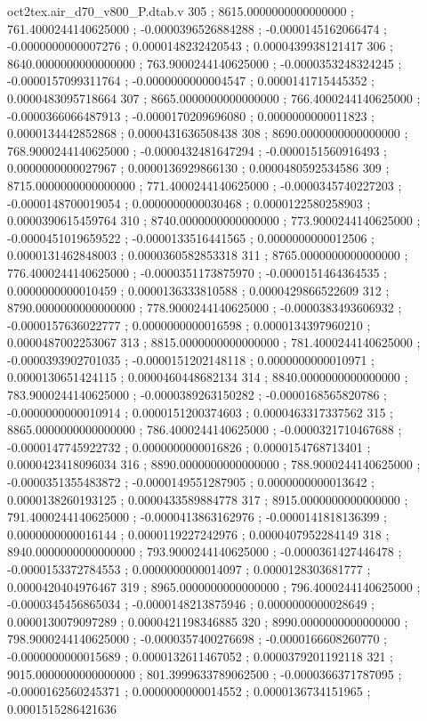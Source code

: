 \begin{filecontents}[overwrite]{oct2tex.air_d70_v800_P.dtab.v}
305 ; 8615.0000000000000000 ; 761.4000244140625000 ; -0.0000396526884288 ; -0.0000145162066474 ; -0.0000000000007276 ; 0.0000148232420543 ; 0.0000439938121417
306 ; 8640.0000000000000000 ; 763.9000244140625000 ; -0.0000353248324245 ; -0.0000157099311764 ; -0.0000000000004547 ; 0.0000141715445352 ; 0.0000483095718664
307 ; 8665.0000000000000000 ; 766.4000244140625000 ; -0.0000366066487913 ; -0.0000170209696080 ; 0.0000000000011823 ; 0.0000134442852868 ; 0.0000431636508438
308 ; 8690.0000000000000000 ; 768.9000244140625000 ; -0.0000432481647294 ; -0.0000151560916493 ; 0.0000000000027967 ; 0.0000136929866130 ; 0.0000480592534586
309 ; 8715.0000000000000000 ; 771.4000244140625000 ; -0.0000345740227203 ; -0.0000148700019054 ; 0.0000000000030468 ; 0.0000122580258903 ; 0.0000390615459764
310 ; 8740.0000000000000000 ; 773.9000244140625000 ; -0.0000451019659522 ; -0.0000133516441565 ; 0.0000000000012506 ; 0.0000131462848003 ; 0.0000360582853318
311 ; 8765.0000000000000000 ; 776.4000244140625000 ; -0.0000351173875970 ; -0.0000151464364535 ; 0.0000000000010459 ; 0.0000136333810588 ; 0.0000429866522609
312 ; 8790.0000000000000000 ; 778.9000244140625000 ; -0.0000383493606932 ; -0.0000157636022777 ; 0.0000000000016598 ; 0.0000134397960210 ; 0.0000487002253067
313 ; 8815.0000000000000000 ; 781.4000244140625000 ; -0.0000393902701035 ; -0.0000151202148118 ; 0.0000000000010971 ; 0.0000130651424115 ; 0.0000460448682134
314 ; 8840.0000000000000000 ; 783.9000244140625000 ; -0.0000389263150282 ; -0.0000168565820786 ; -0.0000000000010914 ; 0.0000151200374603 ; 0.0000463317337562
315 ; 8865.0000000000000000 ; 786.4000244140625000 ; -0.0000321710467688 ; -0.0000147745922732 ; 0.0000000000016826 ; 0.0000154768713401 ; 0.0000423418096034
316 ; 8890.0000000000000000 ; 788.9000244140625000 ; -0.0000351355483872 ; -0.0000149551287905 ; 0.0000000000013642 ; 0.0000138260193125 ; 0.0000433589884778
317 ; 8915.0000000000000000 ; 791.4000244140625000 ; -0.0000413863162976 ; -0.0000141818136399 ; 0.0000000000016144 ; 0.0000119227242976 ; 0.0000407952284149
318 ; 8940.0000000000000000 ; 793.9000244140625000 ; -0.0000361427446478 ; -0.0000153372784553 ; 0.0000000000014097 ; 0.0000128303681777 ; 0.0000420404976467
319 ; 8965.0000000000000000 ; 796.4000244140625000 ; -0.0000345456865034 ; -0.0000148213875946 ; 0.0000000000028649 ; 0.0000130079097289 ; 0.0000421198346885
320 ; 8990.0000000000000000 ; 798.9000244140625000 ; -0.0000357400276698 ; -0.0000166608260770 ; -0.0000000000015689 ; 0.0000132611467052 ; 0.0000379201192118
321 ; 9015.0000000000000000 ; 801.3999633789062500 ; -0.0000366371787095 ; -0.0000162560245371 ; 0.0000000000014552 ; 0.0000136734151965 ; 0.0001515286421636

\end{filecontents}
